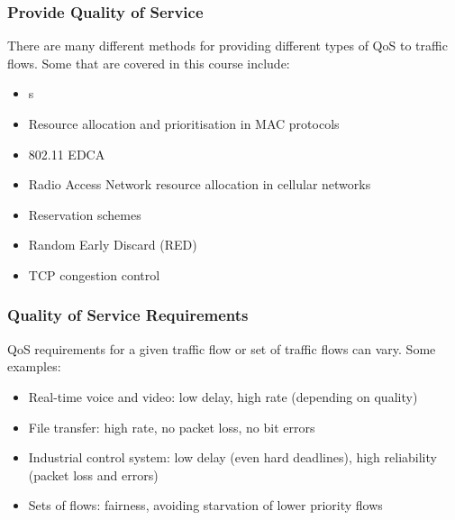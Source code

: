 \subsubsection{Provide Quality of Service}\label{subsubsec:Provide_QoS}
There are many different methods for providing different types of QoS to traffic flows.
Some that are covered in this course include:
\begin{itemize}[noitemsep]
\item {}s
\item Resource allocation and prioritisation in MAC protocols
\item 802.11 EDCA
\item Radio Access Network resource allocation in cellular networks
\item Reservation schemes
\item Random Early Discard (RED)
\item TCP congestion control
\end{itemize}

\subsubsection{Quality of Service Requirements}\label{subsubsec:QoS_Requirements}
QoS requirements for a given traffic flow or set of traffic flows can vary.
Some examples:
\begin{itemize}[noitemsep]
\item Real-time voice and video: low delay, high rate (depending on quality)
\item File transfer: high rate, no packet loss, no bit errors
\item Industrial control system: low delay (even hard deadlines), high reliability (packet loss and errors)
\item Sets of flows: fairness, avoiding starvation of lower priority flows
\end{itemize}






